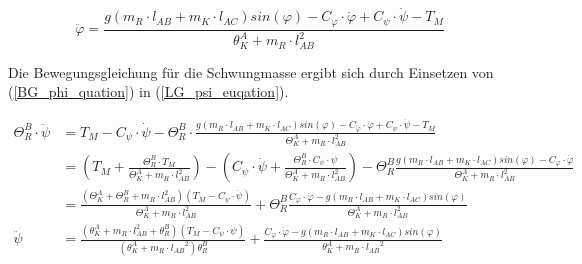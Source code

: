 \begin{equation}
\label{BG_phi_quation}
\ddot{\varphi} = \frac{g(m_R \cdot l_{AB} + m_K \cdot l_{AC})sin(\varphi) - C_{\varphi} \cdot \dot{\varphi} + C_{\psi} \cdot \dot{\psi} - T_M}{{\theta}^A_K + m_R \cdot l_{AB}^2}
\end{equation}

Die Bewegungsgleichung für die Schwungmasse ergibt sich durch Einsetzen von (\ref{BG_phi_quation}) in (\ref{LG_psi_euqation}).

\begin{equation}
\label{BG_psi_equation}
\begin{split}
\Theta^B_R \cdot \ddot{\psi} &= T_M - C_{\psi} \cdot \dot{\psi} - \Theta^B_R \cdot \frac{g(m_R\cdot l_{AB} + m_K \cdot l_{AC})sin(\varphi) - C_{\varphi} \cdot \dot{\varphi} + C_{\psi} \cdot \dot{\psi} - T_M}{\Theta^A_K + m_R \cdot l^2_{AB}} \\
 & = \left(T_M + \frac{\Theta^B_R \cdot T_M}{\Theta^A_K + m_R \cdot l^2_{AB}} \right) - \left(C_{\psi} \cdot \dot{\psi} + \frac{ \Theta^B_R \cdot C_{\psi} \cdot \dot{\psi} }{ \Theta^A_K + m_R \cdot l^2_{AB} } \right)  - \Theta^B_R \frac{g(m_R\cdot l_{AB} + m_K \cdot l_{AC})sin(\varphi) - C_{\varphi} \cdot  \dot{\varphi}}{\Theta^A_K + m_R \cdot l^2_{AB}} \\
 & = \frac{(\Theta^A_K + \Theta^B_R + m_R \cdot l^2_{AB})(T_M - C_{\psi} \cdot \dot{\psi})}{\Theta^A_K + m_R \cdot l^2_{AB}} + \Theta^B_R \frac{C_{\varphi} \cdot  \dot{\varphi} - g(m_R\cdot l_{AB} + m_K \cdot l_{AC})sin(\varphi) }{\Theta^A_K + m_R \cdot l^2_{AB}} \\
\ddot{\psi} &= \frac{({\theta}^A_K + m_R \cdot l_{AB}^2 + {\theta}^B_R)(T_M - C_{\psi} \cdot \dot{\psi})}{({\theta}^A_K + m_R \cdot {l_{AB}}^2){\theta}^B_R} + \frac{C_{\varphi} \cdot \dot{\varphi} - g(m_R \cdot l_{AB} + m_K \cdot l_{AC})sin(\varphi)}{{\theta}^A_K + m_R \cdot {l_{AB}}^2}
\end{split}
\end{equation}